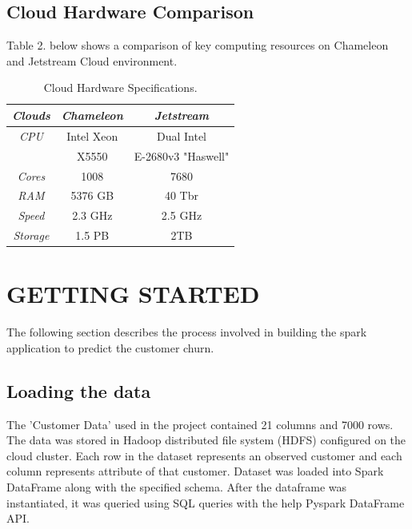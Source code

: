 \documentclass[9pt,twocolumn,twoside]{../../styles/osajnl}
\begin{document}
	\subsection{Cloud Hardware Comparison}
		Table 2. below shows a comparison of key computing resources on Chameleon and Jetstream Cloud environment.
	
	\begin{table}[h!]
		\centering
		\begin{tabular}{|c|c c|} 
			\hline
			\textit{Clouds} & \textit{Chameleon} & \textit{Jetstream} \\ 
			\hline
			\hline 
			\textit{CPU} & Intel Xeon & Dual Intel \\ 
			& X5550 & E-2680v3 "Haswell" \\
			\hline 
			\textit{Cores} & 1008 & 7680 \\
			\hline 			
			\textit{RAM} & 5376 GB & 40 Tbr \\ 
			\hline 
			\textit{Speed} & 2.3 GHz & 2.5 GHz\\
			\hline 
			\textit{Storage} & 1.5 PB & 2TB \\
			\hline 

		\end{tabular}
		\caption{Cloud Hardware Specifications.}
		\label{table:clouds}
	\end{table}
	
\section{GETTING STARTED}
	The following section describes the process involved in building the spark application to predict the customer churn.
	
	\subsection{Loading the data}
		The 'Customer Data' used in the project contained 21 columns and 7000 rows. The data was stored in Hadoop distributed file system (HDFS) configured on the cloud cluster. Each row in the dataset represents an observed customer and each column represents attribute of that customer. Dataset was loaded into Spark DataFrame \cite{DataFrame} along with the specified schema. After the dataframe was instantiated, it was queried using SQL queries with the help Pyspark DataFrame API.
\end{document}
